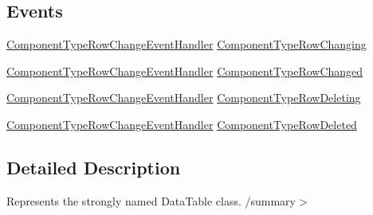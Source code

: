 \subsection*{Events}
\begin{DoxyCompactItemize}
\item 
\hyperlink{class_env_int_1_1_win32_1_1_field_tech_1_1_manager_1_1_data_sets_1_1_guide_ware_mobile_data_set_abd1972df64c9aa03de1019f79a6c4631}{Component\+Type\+Row\+Change\+Event\+Handler} \hyperlink{class_env_int_1_1_win32_1_1_field_tech_1_1_manager_1_1_data_sets_1_1_guide_ware_mobile_data_set_1_1_component_type_data_table_a162f3ee38947c0d7fc166a325661c03f}{Component\+Type\+Row\+Changing}
\item 
\hyperlink{class_env_int_1_1_win32_1_1_field_tech_1_1_manager_1_1_data_sets_1_1_guide_ware_mobile_data_set_abd1972df64c9aa03de1019f79a6c4631}{Component\+Type\+Row\+Change\+Event\+Handler} \hyperlink{class_env_int_1_1_win32_1_1_field_tech_1_1_manager_1_1_data_sets_1_1_guide_ware_mobile_data_set_1_1_component_type_data_table_ae80d038c6484ba7a269de3e76d35ac0f}{Component\+Type\+Row\+Changed}
\item 
\hyperlink{class_env_int_1_1_win32_1_1_field_tech_1_1_manager_1_1_data_sets_1_1_guide_ware_mobile_data_set_abd1972df64c9aa03de1019f79a6c4631}{Component\+Type\+Row\+Change\+Event\+Handler} \hyperlink{class_env_int_1_1_win32_1_1_field_tech_1_1_manager_1_1_data_sets_1_1_guide_ware_mobile_data_set_1_1_component_type_data_table_a423421a5ae7a090ecb1862b3176e1f86}{Component\+Type\+Row\+Deleting}
\item 
\hyperlink{class_env_int_1_1_win32_1_1_field_tech_1_1_manager_1_1_data_sets_1_1_guide_ware_mobile_data_set_abd1972df64c9aa03de1019f79a6c4631}{Component\+Type\+Row\+Change\+Event\+Handler} \hyperlink{class_env_int_1_1_win32_1_1_field_tech_1_1_manager_1_1_data_sets_1_1_guide_ware_mobile_data_set_1_1_component_type_data_table_a89415d1154577bf0446e6b9ea70d31f2}{Component\+Type\+Row\+Deleted}
\end{DoxyCompactItemize}


\subsection{Detailed Description}
Represents the strongly named Data\+Table class. /summary$>$ 

